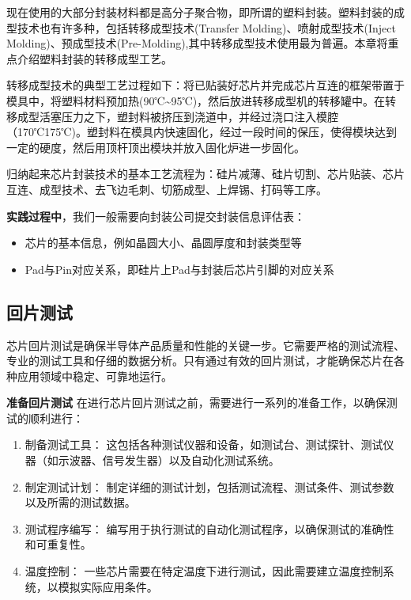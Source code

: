 现在使用的大部分封装材料都是高分子聚合物，即所谓的塑料封装。塑料封装的成型技术也有许多种，包括转移成型技术(Transfer Molding)、喷射成型技术(Inject Molding)、预成型技术(Pre-Molding),其中转移成型技术使用最为普遍。本章将重点介绍塑料封装的转移成型工艺。

转移成型技术的典型工艺过程如下：将已贴装好芯片并完成芯片互连的框架带置于模具中，将塑料材料预加热(90℃\textasciitilde95℃)，然后放进转移成型机的转移罐中。在转移成型活塞压力之下，塑封料被挤压到浇道中，并经过浇口注入模腔（170℃175℃)。塑封料在模具内快速固化，经过一段时间的保压，使得模块达到一定的硬度，然后用顶杆顶出模块并放入固化炉进一步固化。

归纳起来芯片封装技术的基本工艺流程为：硅片减薄、硅片切割、芯片贴装、芯片互连、成型技术、去飞边毛刺、切筋成型、上焊锡、打码等工序。

\textbf{实践过程中}，我们一般需要向封装公司提交封装信息评估表：

\begin{itemize}
\tightlist
\item
  芯片的基本信息，例如晶圆大小、晶圆厚度和封装类型等
\item
  Pad与Pin对应关系，即硅片上Pad与封装后芯片引脚的对应关系
\end{itemize}

\subsection{回片测试}\label{sec:18-test-and-show-003}

芯片回片测试是确保半导体产品质量和性能的关键一步。它需要严格的测试流程、专业的测试工具和仔细的数据分析。只有通过有效的回片测试，才能确保芯片在各种应用领域中稳定、可靠地运行。

\textbf{准备回片测试}
在进行芯片回片测试之前，需要进行一系列的准备工作，以确保测试的顺利进行：

\begin{enumerate}
\def\labelenumi{\arabic{enumi}.}
\tightlist
\item
  制备测试工具： 这包括各种测试仪器和设备，如测试台、测试探针、测试仪器（如示波器、信号发生器）以及自动化测试系统。
\item
  制定测试计划： 制定详细的测试计划，包括测试流程、测试条件、测试参数以及所需的测试数据。
\item
  测试程序编写： 编写用于执行测试的自动化测试程序，以确保测试的准确性和可重复性。
\item
  温度控制： 一些芯片需要在特定温度下进行测试，因此需要建立温度控制系统，以模拟实际应用条件。
\end{enumerate}

